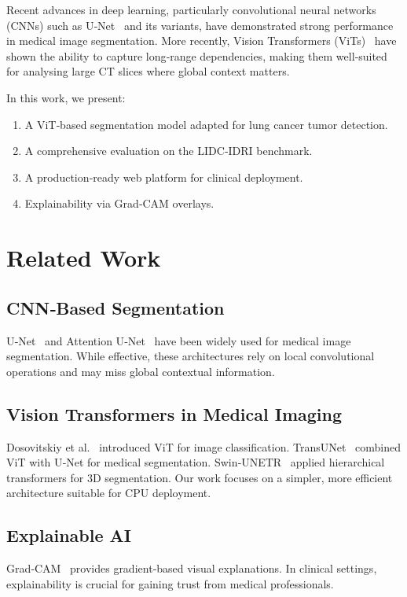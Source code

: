 \documentclass[conference]{IEEEtran}
\begin{document}
Recent advances in deep learning, particularly convolutional neural networks (CNNs) such as U‑Net~\cite{ronneberger2015} and its variants, have demonstrated strong performance in medical image segmentation. More recently, Vision Transformers (ViTs)~\cite{dosovitskiy2020} have shown the ability to capture long‑range dependencies, making them well‑suited for analysing large CT slices where global context matters.

In this work, we present:
\begin{enumerate}
    \item A ViT‑based segmentation model adapted for lung cancer tumor detection.
    \item A comprehensive evaluation on the LIDC‑IDRI benchmark.
    \item A production‑ready web platform for clinical deployment.
    \item Explainability via Grad‑CAM overlays.
\end{enumerate}

\section{Related Work}

\subsection{CNN‑Based Segmentation}
U‑Net~\cite{ronneberger2015} and Attention U‑Net~\cite{oktay2018} have been widely used for medical image segmentation. While effective, these architectures rely on local convolutional operations and may miss global contextual information.

\subsection{Vision Transformers in Medical Imaging}
Dosovitskiy et al.~\cite{dosovitskiy2020} introduced ViT for image classification. TransUNet~\cite{chen2021} combined ViT with U‑Net for medical segmentation. Swin‑UNETR~\cite{swin2022} applied hierarchical transformers for 3D segmentation. Our work focuses on a simpler, more efficient architecture suitable for CPU deployment.

\subsection{Explainable AI}
Grad‑CAM~\cite{selvaraju2017} provides gradient‑based visual explanations. In clinical settings, explainability is crucial for gaining trust from medical professionals.
\end{document}
